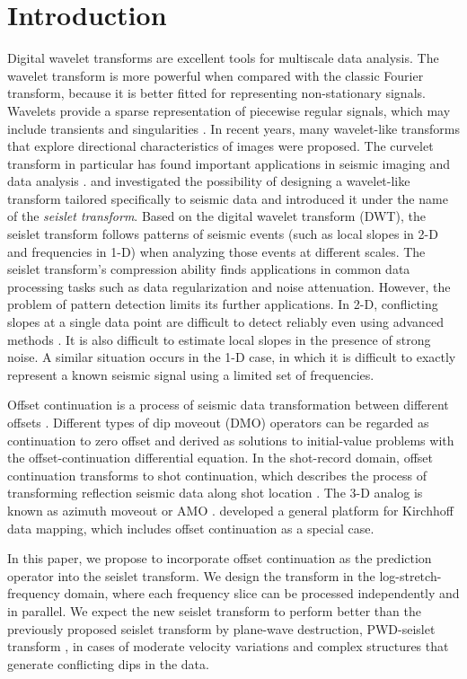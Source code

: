 \section{Introduction}

Digital wavelet transforms are excellent tools for multiscale data
analysis. The wavelet transform is more powerful when compared with
the classic Fourier transform, because it is better fitted for
representing non-stationary signals. Wavelets provide a sparse
representation of piecewise regular signals, which may include
transients and singularities \cite[]{mallat}. In recent years, many
wavelet-like transforms that explore directional characteristics of
images \cite[]{Starck00,Do05,Pennec05,Velisavljevic05} were
proposed. The curvelet transform in particular has found important
applications in seismic imaging and data analysis
\cite[]{douma,chauris,Herrmann2007Let}. \cite{Fomel06} and
\cite{Fomel10} investigated the possibility of designing a
wavelet-like transform tailored specifically to seismic data and
introduced it under the name of the \emph{seislet transform}. Based on
the digital wavelet transform (DWT), the seislet transform follows
patterns of seismic events (such as local slopes in 2-D and
frequencies in 1-D) when analyzing those events at different
scales. The seislet transform's compression ability finds applications
in common data processing tasks such as data regularization and noise
attenuation. However, the problem of pattern detection limits its
further applications. In 2-D, conflicting slopes at a single data
point are difficult to detect reliably even using advanced methods
\cite[]{Fomel02}. It is also difficult to estimate local slopes in the
presence of strong noise. A similar situation occurs in the 1-D case,
in which it is difficult to exactly represent a known seismic signal
using a limited set of frequencies.
\par
Offset continuation is a process of seismic data transformation
between different offsets
\cite[]{Deregowski81,Bolondi82,Salvador82,GEO68-02-07180732}.
Different types of dip moveout (DMO) operators \cite[]{Hale91} can be
regarded as continuation to zero offset and derived as solutions to
initial-value problems with the offset-continuation differential
equation. In the shot-record domain, offset continuation transforms to
shot continuation, which describes the process of transforming
reflection seismic data along shot location
\cite[]{GEO61-06-18461858,Spagnolini96,Fomel03a}. The 3-D analog is
known as azimuth moveout or AMO
\cite[]{GEO63-02-05740588,Fomel03b}. \cite{Bleistein00} developed
 a general platform for Kirchhoff data mapping, which includes offset
 continuation as a special case.
\par
In this paper, we propose to incorporate offset continuation as the
prediction operator into the seislet transform. We design the
transform in the log-stretch-frequency domain, where each frequency
slice can be processed independently and in parallel. We expect the
new seislet transform to perform better than the previously proposed
seislet transform by plane-wave destruction, PWD-seislet transform
\cite[]{Fomel10}, in cases of moderate velocity variations and complex
structures that generate conflicting dips in the data.

